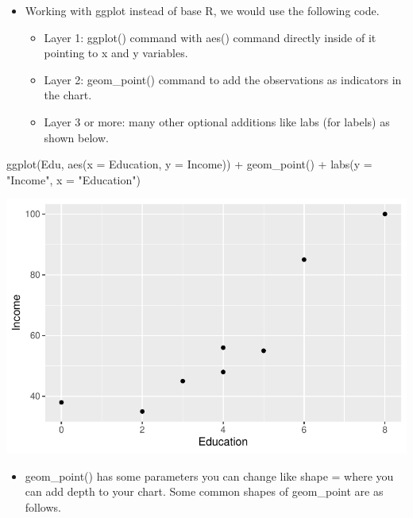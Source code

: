 \documentclass[
  letterpaper,
  DIV=11,
  numbers=noendperiod]{scrreprt}
\newenvironment{Shaded}{\begin{snugshade}}{\end{snugshade}}
\newcommand{\AttributeTok}[1]{\textcolor[rgb]{0.40,0.45,0.13}{#1}}
\newcommand{\FunctionTok}[1]{\textcolor[rgb]{0.28,0.35,0.67}{#1}}
\newcommand{\NormalTok}[1]{\textcolor[rgb]{0.00,0.23,0.31}{#1}}
\newcommand{\SpecialCharTok}[1]{\textcolor[rgb]{0.37,0.37,0.37}{#1}}
\newcommand{\StringTok}[1]{\textcolor[rgb]{0.13,0.47,0.30}{#1}}
\providecommand{\tightlist}{%
  \setlength{\itemsep}{0pt}\setlength{\parskip}{0pt}}\usepackage{longtable,booktabs,array}
\begin{document}
\begin{itemize}
\tightlist
\item
  Working with ggplot instead of base R, we would use the following
  code.

  \begin{itemize}
  \tightlist
  \item
    Layer 1: ggplot() command with aes() command directly inside of it
    pointing to x and y variables.
  \item
    Layer 2: geom\_point() command to add the observations as indicators
    in the chart.
  \item
    Layer 3 or more: many other optional additions like labs (for
    labels) as shown below.
  \end{itemize}
\end{itemize}

\begin{Shaded}
\begin{Highlighting}[]
\FunctionTok{ggplot}\NormalTok{(Edu, }\FunctionTok{aes}\NormalTok{(}\AttributeTok{x =}\NormalTok{ Education, }\AttributeTok{y =}\NormalTok{ Income)) }\SpecialCharTok{+} \FunctionTok{geom\_point}\NormalTok{() }\SpecialCharTok{+} \FunctionTok{labs}\NormalTok{(}\AttributeTok{y =} \StringTok{"Income"}\NormalTok{,}
    \AttributeTok{x =} \StringTok{"Education"}\NormalTok{)}
\end{Highlighting}
\end{Shaded}

\includegraphics{dataviz_files/figure-pdf/unnamed-chunk-45-1.pdf}

\begin{itemize}
\tightlist
\item
  geom\_point() has some parameters you can change like shape = where
  you can add depth to your chart. Some common shapes of geom\_point are
  as follows.
\end{itemize}
\end{document}
